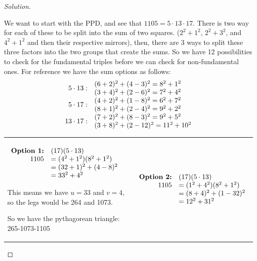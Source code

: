\documentclass[11pt]{article}
\newenvironment{solution}
  {\renewcommand\qedsymbol{$~$}\begin{proof}[Solution]$ $\par\nobreak\ignorespaces}
  {\end{proof}}
\begin{document}
\begin{solution}
  We want to start with the PPD, and see that $1105=5\cdot 13\cdot 17$. There is two way for each of these to be split into the sum of two squares. ($2^2+1^2$, $2^2+3^2$, and $4^2+1^2$ and then their respective mirrors), then, there are 3 ways to split these three factors into the two groups that create the sums. So we have 12 possibilities to check for the fundamental triples before we can check for non-fundamental ones.
  For reference we have the sum options as follows:
  \[
    \begin{array}{rl}
      \multirow{2}{*}{$5\cdot 13:$}  & (6+2)^2+(4-3)^2=8^2+1^2      \\
                                     & (3+4)^2+(2-6)^2 = 7^2+4^2    \\
      \multirow{2}{*}{$5\cdot 17:$}  & (4+2)^2+(1-8)^2=6^2+7^2      \\
                                     & (8+1)^2+(2-4)^2 = 9^2+2^2    \\
      \multirow{2}{*}{$13\cdot 17:$} & (7+2)^2+(8-3)^2=9^2+5^2      \\
                                     & (3+8)^2+(2-12)^2 = 11^2+10^2 \\
    \end{array}
  \]

  \begin{center}
    \begin{NiceTabular}[width=0.95\textwidth]{X[l] !{\qquad} X[l]}
      \begin{math}
        \begin{array}[t]{rl}
          \textbf{Option 1:} & (17)(5\cdot 13)       \\
          1105               & =  (4^2+1^2)(8^2+1^2) \\
                             & = (32+1)^2 + (4-8)^2  \\
                             & = 33^2 + 4^2
        \end{array}
      \end{math}

      This means we have $u=33$ and $v=4$, so the legs would be 264 and 1073.

      So we have the pythagorean triangle:
      265-1073-1105

       &
      \begin{math}
        \begin{array}[t]{rl}
          \textbf{Option 2:} & (17)(5\cdot 13)       \\
          1105               & =  (1^2+4^2)(8^2+1^2) \\
                             & = (8+4)^2 + (1-32)^2  \\
                             & = 12^2 + 31^2         \\
        \end{array}
      \end{math}


\end{NiceTabular}
\end{center}
\end{solution}
\end{document}
